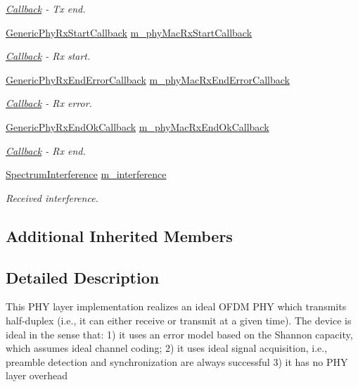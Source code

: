 \begin{DoxyCompactItemize}
\begin{DoxyCompactList}\small\item\em \hyperlink{classns3_1_1Callback}{Callback} -\/ Tx end. \end{DoxyCompactList}\item 
\hyperlink{namespacens3_a1c385b3f90e0583c1debfc4a2721cdcf}{Generic\+Phy\+Rx\+Start\+Callback} \hyperlink{classns3_1_1HalfDuplexIdealPhy_a708f1a267cb2f0e82b731d7fcd7aee04}{m\+\_\+phy\+Mac\+Rx\+Start\+Callback}
\begin{DoxyCompactList}\small\item\em \hyperlink{classns3_1_1Callback}{Callback} -\/ Rx start. \end{DoxyCompactList}\item 
\hyperlink{namespacens3_a726dc36898b6cda5b4855ee1671f51da}{Generic\+Phy\+Rx\+End\+Error\+Callback} \hyperlink{classns3_1_1HalfDuplexIdealPhy_aa3c7a178ca01aa7ac1408249c9fef3f2}{m\+\_\+phy\+Mac\+Rx\+End\+Error\+Callback}
\begin{DoxyCompactList}\small\item\em \hyperlink{classns3_1_1Callback}{Callback} -\/ Rx error. \end{DoxyCompactList}\item 
\hyperlink{namespacens3_a46c93af76ee9401eef0753645edc589d}{Generic\+Phy\+Rx\+End\+Ok\+Callback} \hyperlink{classns3_1_1HalfDuplexIdealPhy_af5bc7ea034a489c4321bb2d7e12187af}{m\+\_\+phy\+Mac\+Rx\+End\+Ok\+Callback}
\begin{DoxyCompactList}\small\item\em \hyperlink{classns3_1_1Callback}{Callback} -\/ Rx end. \end{DoxyCompactList}\item 
\hyperlink{classns3_1_1SpectrumInterference}{Spectrum\+Interference} \hyperlink{classns3_1_1HalfDuplexIdealPhy_a3e647be1ceaacc562ea02dc6210bc32a}{m\+\_\+interference}
\begin{DoxyCompactList}\small\item\em Received interference. \end{DoxyCompactList}\end{DoxyCompactItemize}
\subsection*{Additional Inherited Members}


\subsection{Detailed Description}
This P\+HY layer implementation realizes an ideal O\+F\+DM P\+HY which transmits half-\/duplex (i.\+e., it can either receive or transmit at a given time). The device is ideal in the sense that\+: 1) it uses an error model based on the Shannon capacity, which assumes ideal channel coding; 2) it uses ideal signal acquisition, i.\+e., preamble detection and synchronization are always successful 3) it has no P\+HY layer overhead

